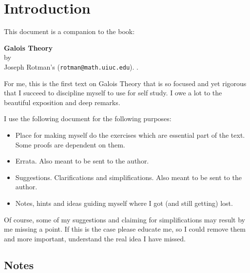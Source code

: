 \maketitle
\newpage
\tableofcontents
\newpage

\setcounter{chapter}{-1}
\chapter{Introduction}

This document is a companion to the book:
\begin{center}
\textbf{Galois Theory}\\
by\\
Joseph Rotman's (\texttt{rotman@math.uiuc.edu}).
\cite{Rotman98}.
\end{center}
For me, this is the first text on Galois Theory that is so focused
and yet rigorous that I succeed to discipline myself
to use for self study.
I owe a lot to the beautiful exposition and deep remarks.

I use the following document for the following purposes:
\begin{itemize}
 \item Place for making myself do the exercises which are
       essential part of the text. Some proofs are dependent on them.
 \item Errata. Also meant to be sent to the author.
 \item Suggestions.  Clarifications and simplifications.
       Also meant to be sent to the author.
 \item Notes, hints and ideas guiding myself where I got (and still getting)
       lost.
\end{itemize}
Of course, some of my suggestions and claiming for simplifications
may result by me missing a point. If this is the case
please educate me, so I could remove them and more important,
understand the real idea I have missed.

\section{Notes}

